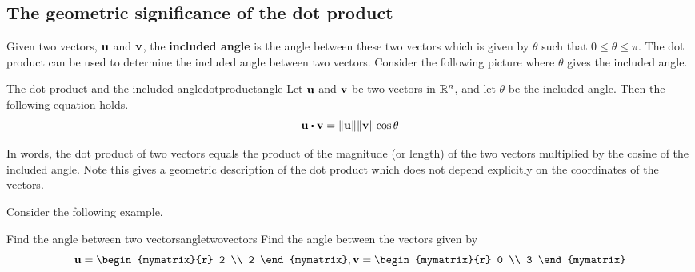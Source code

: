 \subsection{The geometric significance of the dot product}

Given two vectors, ${\bf u}$ and ${\bf v}$, the \textbf{included angle}
  is the angle between these two vectors which
is given by $\theta$ such that $0 \leq \theta \leq \pi$. The dot product can be used to
determine the included angle between two vectors. Consider the following picture where $\theta$ gives the included angle. 

\begin{center}
\end{center}

\begin{proposition}{The dot product and the included angle}{dotproductangle}
Let ${\bf u}$ and ${\bf v}$ be two vectors in $\mathbb{R}^n$, and let 
$\theta$ be the included angle. Then the following equation holds.
\begin{equation*}
\vect{u}\dotprod \vect{v}=\vectlength \vect{u}\vectlength \vectlength \vect{v}
\vectlength \cos \theta 
\end{equation*}
\end{proposition}

In words, the dot product of two vectors equals the product of
the magnitude (or length) of the two vectors multiplied by the cosine of the included
angle. Note this gives a geometric description of the dot product which does
not depend explicitly on the coordinates of the vectors.

Consider the following example.

\begin{example}{Find the angle between two vectors}{angletwovectors}
Find the angle between the vectors given by 
\begin{equation*}
\vect{u}
=
\begin{mymatrix}{r}
2 \\
2
\end{mymatrix}, 
\vect{v}
=
\begin{mymatrix}{r}
0 \\
3 
\end{mymatrix}
\end{equation*}
\end{example}

